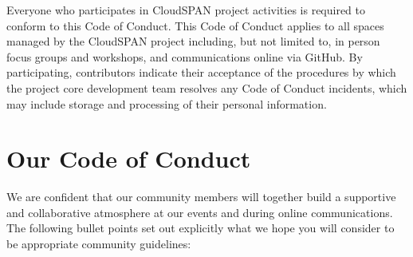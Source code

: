 \documentclass[
]{book}
\begin{document}
Everyone who participates in CloudSPAN project activities is required to conform to this Code of Conduct. This Code of Conduct applies to all spaces managed by the CloudSPAN project including, but not limited to, in person focus groups and workshops, and communications online via GitHub. By participating, contributors indicate their acceptance of the procedures by which the project core development team resolves any Code of Conduct incidents, which may include storage and processing of their personal information.

\hypertarget{our-code-of-conduct}{%
\section{Our Code of Conduct}\label{our-code-of-conduct}}

We are confident that our community members will together build a supportive and collaborative atmosphere at our events and during online communications. The following bullet points set out explicitly what we hope you will consider to be appropriate community guidelines:
\end{document}
